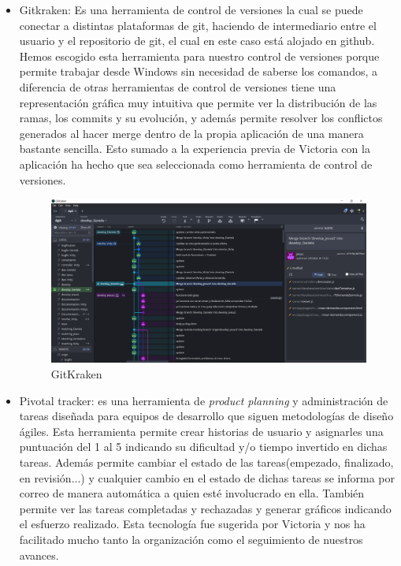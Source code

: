 \documentclass[11pt]{article}
\begin{document}
\begin{itemize}
	\item Gitkraken: Es una herramienta de control de versiones la cual se puede conectar a distintas plataformas de git, haciendo de intermediario entre el usuario y el repositorio de git, el cual en este caso está alojado en github. Hemos escogido esta herramienta para nuestro control de versiones porque permite trabajar desde Windows sin necesidad de saberse los comandos, a diferencia de otras herramientas de control de versiones tiene una representación gráfica muy intuitiva que permite ver la distribución de las ramas, los commits y su evolución, y además permite resolver los conflictos generados al hacer merge dentro de la propia aplicación de una manera bastante sencilla. Esto sumado a la experiencia previa de Victoria con la aplicación ha hecho que sea seleccionada como herramienta de control de versiones.
	\begin{figure}
		\centering
		\includegraphics[scale=0.4]{gitkraken}
		\caption{GitKraken}
	\end{figure}
	
	\item Pivotal tracker: es una herramienta de \emph{product planning} y administración de tareas diseñada para equipos de desarrollo que siguen metodologías de diseño ágiles.
	Esta herramienta permite crear historias de usuario y asignarles una puntuación del 1 al 5 indicando su dificultad y/o tiempo invertido en dichas tareas. Además permite cambiar el estado de las tareas(empezado, finalizado, en revisión...) y cualquier cambio en el estado de dichas tareas se informa por correo de manera automática a quien esté involucrado en ella.
	También permite ver las tareas completadas y rechazadas y generar gráficos indicando el esfuerzo realizado. Esta tecnología fue sugerida por Victoria y nos ha facilitado mucho tanto la organización como el seguimiento de nuestros avances.
	

\end{itemize}
\end{document}
